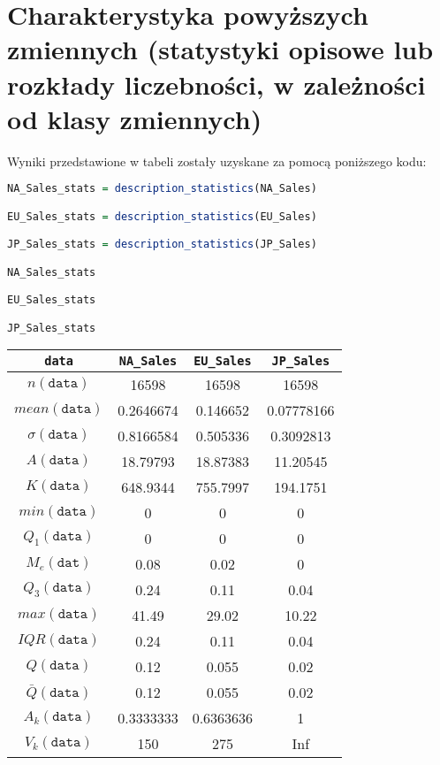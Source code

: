 	\section{Charakterystyka powyższych zmiennych (statystyki opisowe lub rozkłady liczebności, w zależności od klasy zmiennych)}
	Wyniki przedstawione w tabeli zostały uzyskane za pomocą poniższego kodu:
		\begin{lstlisting}[language=R]
NA_Sales_stats = description_statistics(NA_Sales)

EU_Sales_stats = description_statistics(EU_Sales)

JP_Sales_stats = description_statistics(JP_Sales)

NA_Sales_stats

EU_Sales_stats

JP_Sales_stats
\end{lstlisting}
	\begin{center}
	\begin{tabular}{|c|c|c|c|}
	\hline
	\texttt{data} & \texttt{NA\_Sales} &  \texttt{EU\_Sales} &  \texttt{JP\_Sales}\\
	\hline
	$n(\texttt{data})$ & 16598 & 16598 & 16598\\
	\hline
	$mean(\texttt{data})$ & 0.2646674 & 0.146652 & 0.07778166\\
	\hline
	$\sigma(\texttt{data})$ & 0.8166584 & 0.505336 & 0.3092813\\
	\hline
	$A(\texttt{data})$ & 18.79793 & 18.87383 & 11.20545\\
	\hline
	$K(\texttt{data})$ & 648.9344 & 755.7997 & 194.1751\\
	\hline
	$min(\texttt{data})$ & 0 & 0 & 0\\
	\hline
	$Q_1(\texttt{data})$ & 0 & 0 & 0 \\
	\hline
	$M_e(\texttt{dat})$ & 0.08 & 0.02 & 0\\
	\hline
	$Q_3(\texttt{data})$ & 0.24 & 0.11 & 0.04\\
	\hline
	$max(\texttt{data})$ & 41.49 & 29.02 & 10.22\\
	\hline
	$IQR(\texttt{data})$ & 0.24 & 0.11 & 0.04 \\
	\hline
	$Q(\texttt{data})$ & 0.12 & 0.055 & 0.02\\
	\hline
	$\bar{Q}(\texttt{data})$ & 0.12 & 0.055 & 0.02\\
	\hline
	$A_k(\texttt{data})$ & 0.3333333 & 0.6363636 & 1\\
	\hline
	$V_k(\texttt{data})$ & 150 & 275 & Inf\\
	\hline
\end{tabular}	
	\end{center}
